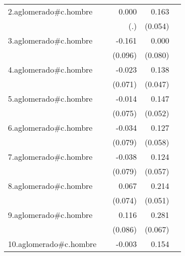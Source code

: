 {\begin{longtable}{l*{4}{D{.}{.}{-1}}}
\addlinespace
2.aglomerado#c.hombre&                     &       0.000         &       0.163\sym{**} &                     \\
            &                     &         (.)         &     (0.054)         &                     \\
\addlinespace
3.aglomerado#c.hombre&                     &      -0.161         &       0.000         &                     \\
            &                     &     (0.096)         &     (0.080)         &                     \\
\addlinespace
4.aglomerado#c.hombre&                     &      -0.023         &       0.138\sym{**} &                     \\
            &                     &     (0.071)         &     (0.047)         &                     \\
\addlinespace
5.aglomerado#c.hombre&                     &      -0.014         &       0.147\sym{**} &                     \\
            &                     &     (0.075)         &     (0.052)         &                     \\
\addlinespace
6.aglomerado#c.hombre&                     &      -0.034         &       0.127\sym{*}  &                     \\
            &                     &     (0.079)         &     (0.058)         &                     \\
\addlinespace
7.aglomerado#c.hombre&                     &      -0.038         &       0.124\sym{*}  &                     \\
            &                     &     (0.079)         &     (0.057)         &                     \\
\addlinespace
8.aglomerado#c.hombre&                     &       0.067         &       0.214\sym{***}&                     \\
            &                     &     (0.074)         &     (0.051)         &                     \\
\addlinespace
9.aglomerado#c.hombre&                     &       0.116         &       0.281\sym{***}&                     \\
            &                     &     (0.086)         &     (0.067)         &                     \\
\addlinespace
10.aglomerado#c.hombre&                     &      -0.003         &       0.154\sym{**} &                     \\

\end{longtable}}
